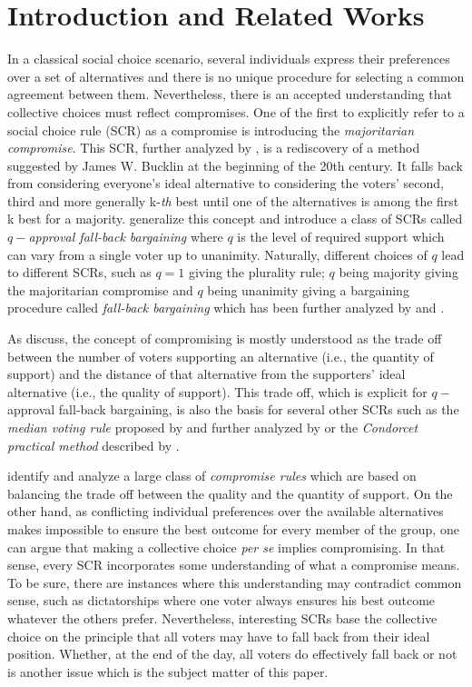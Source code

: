 \documentclass[version=3.21, pagesize, twoside=off, bibliography=totoc, DIV=calc, fontsize=12pt, a4paper]{scrartcl}
\begin{document}
\section{Introduction and Related Works}
\label{sec:introduction}
In a classical social choice scenario, several individuals express their preferences over a set of alternatives and there is no unique procedure for selecting a common agreement between them. Nevertheless, there is an accepted understanding that collective choices must reflect compromises. One of the first to explicitly refer to a social choice rule (SCR) as a compromise is \cite{Sertel1986} introducing the \textit{majoritarian compromise}. This SCR, further analyzed by \cite{Sertel1999}, is a rediscovery of a method suggested by James W. Bucklin  at the beginning of the 20th century. It falls back from considering everyone’s ideal alternative to considering the voters’ second, third and more generally k-\emph{th} best until one of the alternatives is among the first k best for a majority. \cite{Brams2001} generalize this concept and introduce a class of SCRs called $q-$\textit{approval fall-back bargaining }where $q$ is the level of required support which can vary from a single voter up to unanimity. Naturally, different choices of $q$ lead to different SCRs, such as $q=1$ giving the plurality rule; $q$ being majority giving the majoritarian compromise and $q$ being unanimity giving a bargaining procedure called \textit{fall-back bargaining} which has been further analyzed by \cite{Kibris2007} and \cite{Congar2012}. 

As \cite{OezkalSanver2004} discuss, the concept of compromising is mostly understood as the trade off between the number of voters supporting an alternative (i.e., the quantity of support) and the distance of that alternative from the supporters' ideal alternative (i.e., the quality of support). This trade off, which is explicit for $q-$approval fall-back bargaining, is also the basis for several other SCRs such as the \textit{median voting rule} proposed by \cite{Bassett1999} and further analyzed by \cite{Gehrlein2003} or the \textit{Condorcet practical method }described by \cite{Nurmi1999}.

\cite{Merlin2019} identify and analyze a large class of \textit{compromise rules} which are based on balancing the trade off between the quality and the quantity of support. On the other hand, as conflicting
individual preferences over the available alternatives makes impossible to ensure the best outcome for every member of the group, one can argue that making a collective choice \textit{per se} implies compromising. In that sense, every SCR incorporates some understanding of what a compromise means. To be sure, there are instances where this understanding may contradict common sense, such as dictatorships where one voter always ensures his best outcome whatever the others prefer. Nevertheless, interesting SCRs base the collective choice on the principle that all voters may have to fall back from their ideal position. Whether, at the end of the day, all voters do effectively fall back or not is another issue which is the subject matter of this paper.
\end{document}
